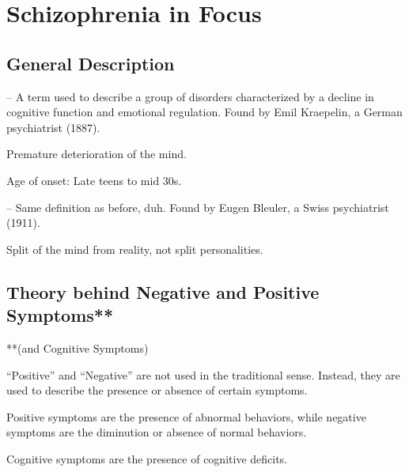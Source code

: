 \section{Schizophrenia in Focus}

\subsection{General Description}

\begin{coloredlist}
    \item {} -- A term used to describe a group of disorders characterized by a decline in cognitive function and emotional regulation. Found by Emil Kraepelin, a German psychiatrist (1887).
    \begin{coloredlist}
        \item Premature deterioration of the mind.
    \end{coloredlist}
    \item Age of onset: Late teens to mid 30s.
    \item {} -- Same definition as before, duh. Found by Eugen Bleuler, a Swiss psychiatrist (1911).
    \begin{coloredlist}
        \item Split of the mind from reality, not split personalities.
    \end{coloredlist}
\end{coloredlist}

\subsection{Theory behind Negative and Positive Symptoms**}
**(and Cognitive Symptoms)
\begin{coloredlist}
    \item ``Positive'' and ``Negative'' are not used in the traditional sense. Instead, they are used to describe the presence or absence of certain symptoms.
    \begin{coloredlist}
        \item Positive symptoms are the presence of abnormal behaviors, while negative symptoms are the diminution or absence of normal behaviors.
        \item Cognitive symptoms are the presence of cognitive deficits.
    \end{coloredlist}
\end{coloredlist}

